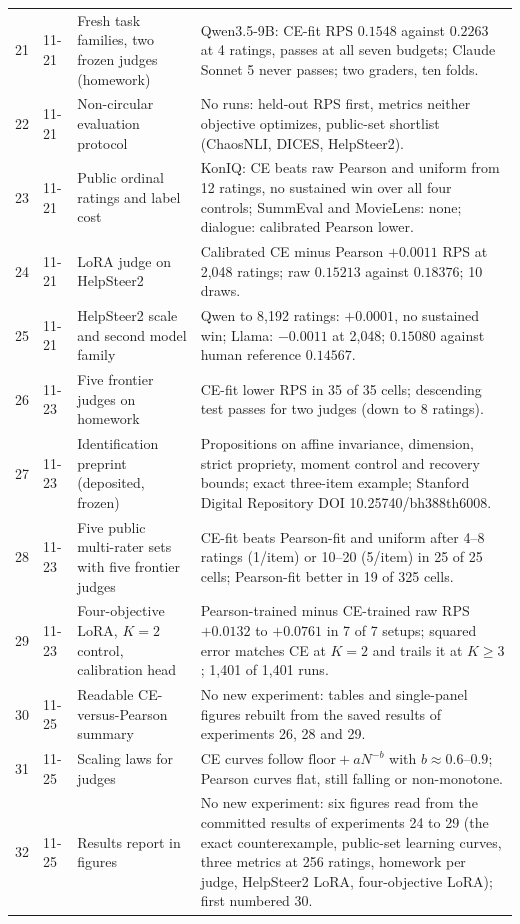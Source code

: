 {\begin{longtable}{@{}p{}p{}p{}p{}@{}}
21 & 11-21 & Fresh task families, two frozen judges (homework) & Qwen3.5-9B: CE-fit RPS $0.1548$ against $0.2263$ at 4 ratings, passes at all seven budgets; Claude Sonnet 5 never passes; two graders, ten folds. \\
22 & 11-21 & Non-circular evaluation protocol & No runs: held-out RPS first, metrics neither objective optimizes, public-set shortlist (ChaosNLI, DICES, HelpSteer2). \\
23 & 11-21 & Public ordinal ratings and label cost & KonIQ: CE beats raw Pearson and uniform from 12 ratings, no sustained win over all four controls; SummEval and MovieLens: none; dialogue: calibrated Pearson lower. \\
24 & 11-21 & LoRA judge on HelpSteer2 & Calibrated CE minus Pearson $+0.0011$ RPS at 2{,}048 ratings; raw $0.15213$ against $0.18376$; 10 draws. \\
25 & 11-21 & HelpSteer2 scale and second model family & Qwen to 8{,}192 ratings: $+0.0001$, no sustained win; Llama: $-0.0011$ at 2{,}048; $0.15080$ against human reference $0.14567$. \\
26 & 11-23 & Five frontier judges on homework & CE-fit lower RPS in 35 of 35 cells; descending test passes for two judges (down to 8 ratings). \\
27 & 11-23 & Identification preprint (deposited, frozen) & Propositions on affine invariance, dimension, strict propriety, moment control and recovery bounds; exact three-item example; Stanford Digital Repository DOI 10.25740/bh388th6008. \\
28 & 11-23 & Five public multi-rater sets with five frontier judges & CE-fit beats Pearson-fit and uniform after 4--8 ratings (1/item) or 10--20 (5/item) in 25 of 25 cells; Pearson-fit better in 19 of 325 cells. \\
29 & 11-23 & Four-objective LoRA, $K=2$ control, calibration head & Pearson-trained minus CE-trained raw RPS $+0.0132$ to $+0.0761$ in 7 of 7 setups; squared error matches CE at $K=2$ and trails it at $K\ge3$; 1{,}401 of 1{,}401 runs. \\
30 & 11-25 & Readable CE-versus-Pearson summary & No new experiment: tables and single-panel figures rebuilt from the saved results of experiments 26, 28 and 29. \\
31 & 11-25 & Scaling laws for judges & CE curves follow $\mathrm{floor}+aN^{-b}$ with $b\approx0.6$--$0.9$; Pearson curves flat, still falling or non-monotone. \\
32 & 11-25 & Results report in figures & No new experiment: six figures read from the committed results of experiments 24 to 29 (the exact counterexample, public-set learning curves, three metrics at 256 ratings, homework per judge, HelpSteer2 LoRA, four-objective LoRA); first numbered 30. \\

\end{longtable}}
